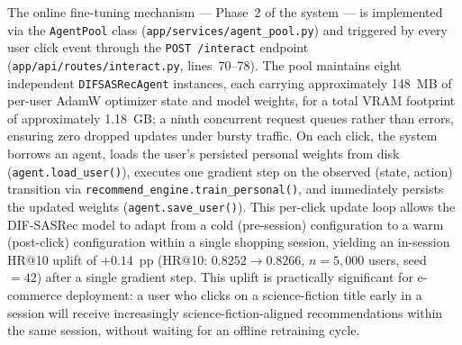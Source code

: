 The online fine-tuning mechanism --- Phase~2 of the system --- is implemented via the
\texttt{AgentPool} class (\texttt{app/services/agent\_pool.py}) and triggered by every
user click event through the \texttt{POST /interact} endpoint
(\texttt{app/api/routes/interact.py}, lines~70--78).
The pool maintains eight independent \texttt{DIFSASRecAgent} instances, each carrying
approximately 148~MB of per-user AdamW optimizer state and model weights, for a total VRAM
footprint of approximately 1.18~GB; a ninth concurrent request queues rather than errors,
ensuring zero dropped updates under bursty traffic.
On each click, the system borrows an agent, loads the user's persisted personal weights from
disk (\texttt{agent.load\_user()}), executes one gradient step on the observed
(state, action) transition via \texttt{recommend\_engine.train\_personal()}, and immediately
persists the updated weights (\texttt{agent.save\_user()}).
This per-click update loop allows the DIF-SASRec model to adapt from a cold (pre-session)
configuration to a warm (post-click) configuration within a single shopping session, yielding
an in-session HR@10 uplift of $+0.14$~pp (HR@10: $0.8252 \to 0.8266$, $n{=}5{,}000$ users,
seed~$=42$) after a single gradient step.
This uplift is practically significant for e-commerce deployment: a user who clicks on a
science-fiction title early in a session will receive increasingly science-fiction-aligned
recommendations within the same session, without waiting for an offline retraining cycle.


